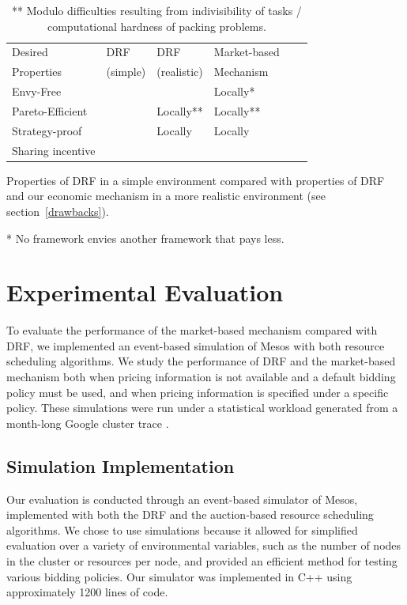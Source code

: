 \documentclass{acm_proc_article-sp}
\newcommand{\cmark}{\ding{51}}%
\begin{document}
\begin{table}[t!]
    \begin{tabular}{| l | l | l | l | l | l |}
    \hline
    Desired & \small DRF & \small DRF & \small Market-based  \\
    Properties & \small(simple) & \small (realistic) & \small Mechanism \\
    \hline
    \small Envy-Free & \cmark &  & Locally* \\
    \small Pareto-Efficient & \cmark & Locally** & Locally**   \\
    \small Strategy-proof & \cmark & Locally  & Locally \\
    \small Sharing incentive & \cmark &  & \cmark\\
    \hline
    \end{tabular}
  \caption{Properties of DRF in a simple environment
 compared with properties of DRF and our economic mechanism
 in a more realistic environment (see section~\ref{drawbacks}).}
\caption*{* No framework envies another framework that pays less.}
\caption*{** Modulo difficulties resulting from indivisibility of tasks / computational
hardness of packing problems.}
  \label{table:props}
\end{table}


\section{Experimental Evaluation}
\label{sec:eval}

To evaluate the performance of the market-based mechanism compared with DRF,
we implemented an event-based simulation of Mesos with both resource scheduling algorithms.
We study the performance of DRF and the market-based mechanism both when pricing information is not available and a default bidding policy must be used, and when pricing information is specified under a specific policy. These simulations were run under a statistical workload generated from a month-long Google cluster trace \cite{googlecluster}.
\vspace{-1mm}
\subsection{Simulation Implementation}
Our evaluation is conducted through an event-based simulator of Mesos, implemented with both the DRF and the auction-based resource scheduling algorithms. We chose to use simulations because it allowed for simplified evaluation over a variety of environmental variables, such as the number of nodes in the cluster or resources per node, and provided an efficient method for testing various bidding policies. Our simulator was implemented in C++ using approximately 1200 lines of code.
\end{document}
